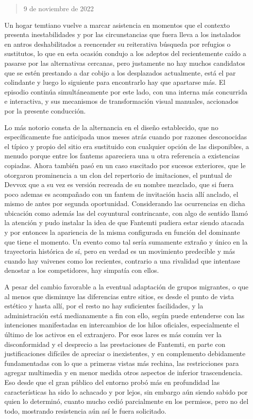 \documentclass[
]{book}
\begin{document}
\begin{quote}
9 de noviembre de 2022
\end{quote}

Un hogar temtiano vuelve a marcar asistencia en momentos que el contexto presenta inestabilidades y por las circunstancias que fuera lleva a los instalados en antros deshabilitados a reencender su reiterativa búsqueda por refugios o sustitutos, lo que en esta ocasión condujo a los adeptos del recientemente caído a pasarse por las alternativas cercanas, pero justamente no hay muchos candidatos que se estén prestando a dar cobijo a los desplazados actualmente, está el par colindante y luego lo siguiente para encontrarlo hay que apartarse más. El episodio continúa simultáneamente por este lado, con una interna más concurrida e interactiva, y sus mecanismos de transformación visual manuales, accionados por la presente conducción.

Lo más notorio consta de la alternancia en el diseño establecido, que no específicamente fue anticipada unos meses atrás cuando por razones desconocidas el típico y propio del sitio era sustituido con cualquier opción de las disponibles, a menudo porque entre los fantems apareciera una u otra referencia a existencias copiadas. Ahora también pasó en un caso suscitado por sucesos exteriores, que le otorgaron prominencia a un clon del repertorio de imitaciones, el puntual de Devvox que a su vez es versión recreada de su nombre mezclado, que si fuera poco ademas es acompañado con un fantem de invitación hacia allí anclado, el mismo de antes por segunda oportunidad. Considerando las ocurrencias en dicha ubicación como además las del coyuntural contrincante, con algo de sentido llamó la atención y pudo instalar la idea de que Fantemti pudiera estar siendo atacada y por entonces la apariencia de la misma configurada en función del dominante que tiene el momento. Un evento como tal sería sumamente extraño y único en la trayectoria histórica de sí, pero en verdad es un movimiento predecible y más cuando hay vaivenes como los recientes, contrario a una rivalidad que intentase denostar a los competidores, hay simpatía con ellos.

A pesar del cambio favorable a la eventual adaptación de grupos migrantes, o que al menos que disminuye las diferencias entre sitios, es desde el punto de vista estético y hasta allí, por el resto no hay suficientes facilidades, y la administración está medianamente a fin con ello, según puede entenderse con las intenciones manifestadas en intercambios de los hilos oficiales, especialmente el último de los activos en el extranjero. Por esos lares es más común ver la disconformidad y el desprecio a las prestaciones de Fantemti, en parte con justificaciones difíciles de apreciar o inexistentes, y en complemento debidamente fundamentadas con lo que a primeras vistas más rechina, las restricciones para agregar multimedia y en menor medida otros aspectos de inferior trascendencia. Eso desde que el gran público del entorno probó más en profundidad las características ha sido lo achacado y por lejos, sin embargo aún siendo sabido por quien lo determinó, cuanto mucho cedió parcialmente en los permisos, pero no del todo, mostrando resistencia aún así le fuera solicitado.
\end{document}
